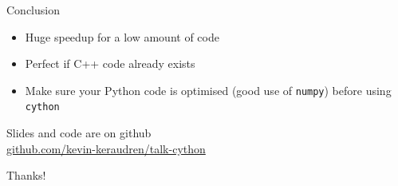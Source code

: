 \documentclass[12pt]{beamer}
\begin{document}
\begin{frame}{Conclusion}

\begin{itemize}
\item Huge speedup for a low amount of code
\item Perfect if C++ code already exists
\item Make sure your Python code is optimised (good use of \texttt{numpy})
  before using \texttt{cython}  
\end{itemize}

\vspace{0.05\textheight}

\begin{center}
\large
Slides and code are on github\\
\url{github.com/kevin-keraudren/talk-cython}
\end{center}
\end{frame}


\begin{frame}
\begin{center}
\LARGE
\textcolor{specialblue}{Thanks!}
\end{center}
\end{frame}
\end{document}
